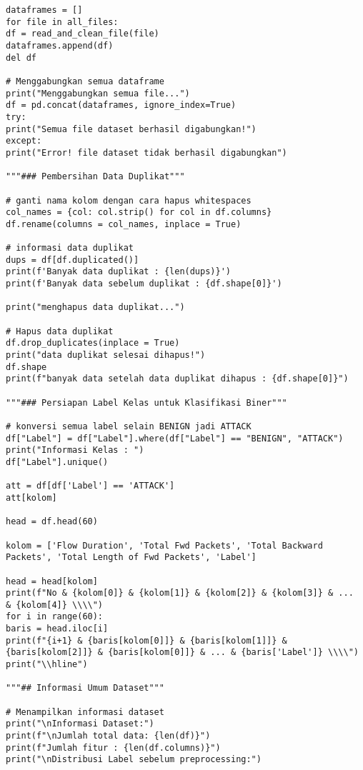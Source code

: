 \documentclass[a4paper,12pt]{report}
\begin{document}
\begin{lstlisting}
dataframes = []
for file in all_files:
df = read_and_clean_file(file)
dataframes.append(df)
del df

# Menggabungkan semua dataframe
print("Menggabungkan semua file...")
df = pd.concat(dataframes, ignore_index=True)
try:
print("Semua file dataset berhasil digabungkan!")
except:
print("Error! file dataset tidak berhasil digabungkan")

"""### Pembersihan Data Duplikat"""

# ganti nama kolom dengan cara hapus whitespaces
col_names = {col: col.strip() for col in df.columns}
df.rename(columns = col_names, inplace = True)

# informasi data duplikat
dups = df[df.duplicated()]
print(f'Banyak data duplikat : {len(dups)}')
print(f'Banyak data sebelum duplikat : {df.shape[0]}')

print("menghapus data duplikat...")

# Hapus data duplikat
df.drop_duplicates(inplace = True)
print("data duplikat selesai dihapus!")
df.shape
print(f"banyak data setelah data duplikat dihapus : {df.shape[0]}")

"""### Persiapan Label Kelas untuk Klasifikasi Biner"""

# konversi semua label selain BENIGN jadi ATTACK
df["Label"] = df["Label"].where(df["Label"] == "BENIGN", "ATTACK")
print("Informasi Kelas : ")
df["Label"].unique()

att = df[df['Label'] == 'ATTACK']
att[kolom]

head = df.head(60)

kolom = ['Flow Duration', 'Total Fwd Packets', 'Total Backward 
Packets', 'Total Length of Fwd Packets', 'Label']

head = head[kolom]
print(f"No & {kolom[0]} & {kolom[1]} & {kolom[2]} & {kolom[3]} & ... 
& {kolom[4]} \\\\")
for i in range(60):
baris = head.iloc[i]
print(f"{i+1} & {baris[kolom[0]]} & {baris[kolom[1]]} & 
{baris[kolom[2]]} & {baris[kolom[0]]} & ... & {baris['Label']} \\\\")
print("\\hline")

"""## Informasi Umum Dataset"""

# Menampilkan informasi dataset
print("\nInformasi Dataset:")
print(f"\nJumlah total data: {len(df)}")
print(f"Jumlah fitur : {len(df.columns)}")
print("\nDistribusi Label sebelum preprocessing:")


\end{lstlisting}
\end{document}

